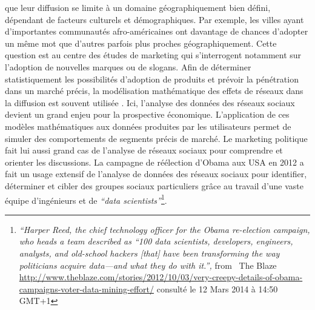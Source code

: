 que leur diffusion se limite à un domaine géographiquement bien défini, dépendant de facteurs culturels et démographiques. Par exemple, les villes ayant d{\textquoteright}importantes communautés afro-américaines ont davantage de chances d{\textquoteright}adopter un m\^eme mot que d{\textquoteright}autres parfois plus proches géographiquement. Cette question est au centre des études de marketing qui s{\textquoteright}interrogent notamment sur l{\textquoteright}adoption de nouvelles marques ou de slogans. Afin de déterminer statistiquement les possibilités d{\textquoteright}adoption de produits et prévoir la pénétration dans un marché précis, la modélisation mathématique des effets de réseaux dans la diffusion est souvent utilisée \citep{Bass1994}. Ici, l{\textquoteright}analyse des données des réseaux sociaux devient un grand enjeu pour la prospective économique. L{\textquoteright}application de ces modèles mathématiques aux données produites par les utilisateurs permet de simuler des comportements de segments précis de marché. Le marketing politique fait lui aussi grand cas de l{\textquoteright}analyse de réseaux sociaux pour comprendre et orienter les discussions. La campagne de réélection d{\textquoteright}Obama aux USA en 2012 a fait un usage extensif de l{\textquoteright}analyse de données des réseaux sociaux pour identifier, déterminer et cibler des groupes sociaux particuliers gr\^ace au travail d{\textquoteright}une vaste équipe d{\textquoteright}ingénieurs et de \textit{{\textquotedblleft}data scientists{\textquotedblright}}\footnote{ \textit{{\textquotedblleft}Harper Reed, the chief technology officer for the Obama re-election campaign, who heads a team described as {\textquotedblleft}100 data scientists, developers, engineers, analysts, and old-school hackers [that] have been transforming the way politicians acquire data---and what they do with it.{\textquotedblright}, }from \ The Blaze \url{http://www.theblaze.com/stories/2012/10/03/very-creepy-details-of-obama-campaigns-voter-data-mining-effort/} consulté le 12 Mars 2014 à 14:50 GMT+1}. 

